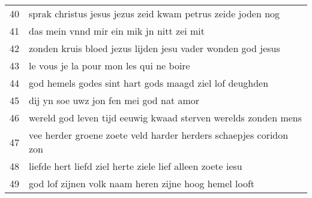 \begin{longtable}{p{} | p{}}
	40    & sprak christus jesus jezus zeid kwam petrus zeide joden nog        \\
	41    & das mein vnnd mir ein mik jn nitt zei mit                          \\
	42    & zonden kruis bloed jezus lijden jesu vader wonden god jesus        \\
	43    & le vous je la pour mon les qui ne boire                            \\
	44    & god hemels godes sint hart gods maagd ziel lof deughden            \\
	45    & dij yn soe uwz jon fen mei god nat amor                            \\
	46    & wereld god leven tijd eeuwig kwaad sterven werelds zonden mens     \\
	47    & vee herder groene zoete veld harder herders schaepjes coridon zon  \\
	48    & liefde hert liefd ziel herte ziele lief alleen zoete iesu          \\
	49    & god lof zijnen volk naam heren zijne hoog hemel looft   \\
	\bottomrule          
\end{longtable}